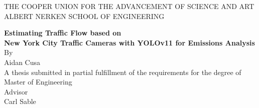 \begin{titlepage}
    \centering
    {THE COOPER UNION FOR THE ADVANCEMENT OF SCIENCE AND ART}\\
    {ALBERT NERKEN SCHOOL OF ENGINEERING}
    \vspace*{1.75in}

    {\Huge \textbf{Estimating Traffic Flow based on\\New York City Traffic Cameras with YOLOv11 for Emissions Analysis}}\\[1em]
    {\normalsize By}\\[0.75em]
    {\large Aidan Cusa}\\[15em]

    {A thesis submitted in partial fulfillment of the requirements for the degree of}\\
    {Master of Engineering}\\[2em]

    {Advisor}\\[1em]
    {Carl Sable}
\end{titlepage}

